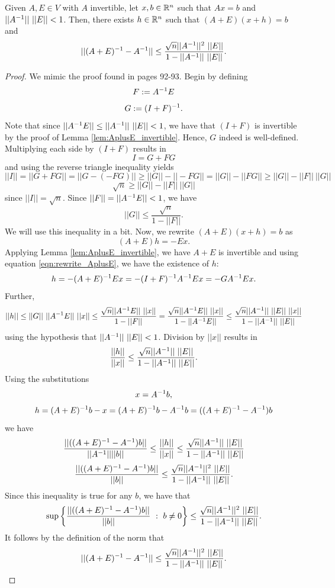 \documentclass[letterpaper,titlepage]{article}
\begin{document}
\begin{lem}\label{lem:AplusEinv_minus_Ainv_ineq}
    Given $A, E\in V$ with $A$ invertible, let $x,b \in \mathbb{R}^n$ such that $Ax=b$ and $||A^{-1}||\ ||E||<1$. Then, there exists $h\in \mathbb{R}^n$ such that $(A+E)(x+h)=b$ and
    $$||(A+E)\inv-A\inv||\leq\frac{\sqrt{n}||A\inv||^2\ ||E||}{1-||A\inv||\ ||E||}.$$   
\end{lem}
\begin{proof}%
    We mimic the proof found in \cite{Wilkinson} pages 92-93. Begin by defining
    $$F:=A^{-1} E$$
    $$G:=(I+F)^{-1}.$$
    Note that since $||A^{-1} E|| \leq ||A^{-1}||\ ||E||<1$, we have that $(I+F)$ is invertible by the proof of Lemma \ref{lem:AplusE_invertible}. Hence, $G$ indeed is well-defined.
    Multiplying each side by $(I+F)$ results in
    $$I = G+FG$$
    and using the reverse triangle inequality yields
    $$||I|| = ||G+FG|| = ||G-(-FG)|| \geq ||G||-||-FG|| = ||G||-||FG|| \geq ||G||-||F||\ ||G||$$
    $$\sqrt{n} \geq ||G|| -||F||\ ||G||$$
    since $||I||=\sqrt{n}$. Since $||F||=||A^{-1} E|| <1$, we have
    $$||G|| \leq \frac{\sqrt{n}}{1-||F||}.$$
    We will use this inequality in a bit. Now, we rewrite $(A+E)(x+h)=b$ as
    $$(A+E)h=-Ex.$$
    Applying Lemma \ref{lem:AplusE_invertible}, we have $A+E$ is invertible and using equation \ref{eqn:rewrite_AplusE}, we have the existence of $h$:
    $$h = -(A+E)^{-1} Ex = -(I+F)^{-1} A^{-1} Ex=-GA^{-1} Ex.$$
    Further,
    $$||h|| \leq ||G||\ ||A\inv E||\ ||x|| \leq \frac{\sqrt{n}||A\inv E||\ ||x||}{1-||F||} = \frac{\sqrt{n}||A\inv E||\ ||x||}{1-||A\inv E||} \leq \frac{\sqrt{n}||A\inv||\ ||E||\ ||x||}{1-||A\inv||\ ||E||}$$
    using the hypothesis that $||A^{-1}||\ ||E|| < 1$.
    Division by $||x||$ results in
    $$\frac{||h||}{||x||}\leq \frac{\sqrt{n}||A^{-1}||\ ||E||}{1-||A^{-1}||\ ||E||}.$$
    Using the substitutions
    $$x = A^{-1} b,$$
    $$h = (A+E)^{-1} b - x = (A+E)^{-1} b - A^{-1} b = ((A+E)^{-1} -A^{-1})b$$
    we have
    $$\frac{||((A+E)\inv -A\inv)b||}{||A\inv||||b||} \leq \frac{||h||}{||x||} \leq \frac{\sqrt{n}||A\inv||\ ||E||}{1-||A\inv||\ ||E||} $$
    $$\frac{||((A+E)^{-1} -A^{-1})b||}{||b||} \leq \frac{\sqrt{n}||A^{-1}||^2\ ||E||}{1-||A^{-1}||\ ||E||}.$$
    Since this inequality is true for any $b$, we have that
    $$\sup\left\{\frac{||((A+E)\inv -A\inv)b||}{||b||}\ :\ b\neq 0\right\} \leq \frac{\sqrt{n}||A\inv||^2\ ||E||}{1-||A\inv||\ ||E||}.$$
    It follows by the definition of the norm that
    $$||(A+E)\inv-A\inv||\leq\frac{\sqrt{n}||A\inv||^2\ ||E||}{1-||A\inv||\ ||E||}.$$
\end{proof}
\end{document}
